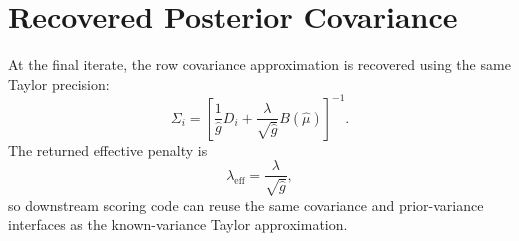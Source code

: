 \documentclass[11pt]{article}
\begin{document}
\section{Recovered Posterior Covariance}

At the final iterate, the row covariance approximation is recovered using the
same Taylor precision:
\begin{equation}
    \Sigma_i =
    \left[
        \frac{1}{\hat g}D_i
        + \frac{\lambda}{\sqrt{\hat g}}B(\hat\mu)
    \right]^{-1}.
\end{equation}
The returned effective penalty is
\begin{equation}
    \lambda_{\mathrm{eff}} = \frac{\lambda}{\sqrt{\hat g}},
\end{equation}
so downstream scoring code can reuse the same covariance and prior-variance
interfaces as the known-variance Taylor approximation.
\end{document}
